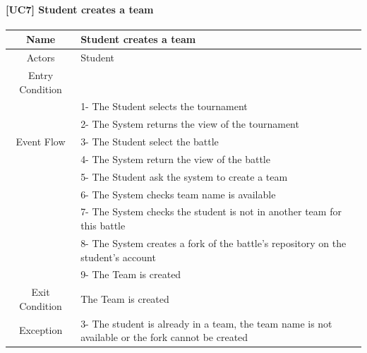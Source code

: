 \documentclass{article}
\begin{document}
\paragraph{[UC7] Student creates a team}
\begin{center}
\begin{tabular}{|c|m{40em}|}
\hline
Name & Student creates a team\\
\hline
\multirow{1}{4em}{Actors}
& Student\\
\hline
Entry Condition & 	\\
\hline
\multirow{5}{4em}{Event Flow}
& 1- The Student selects the tournament\\
& 2- The System returns the view of the tournament\\
& 3- The Student select the battle\\
& 4- The System return the view of the battle\\
& 5- The Student ask the system to create a team\\
& 6- The System checks team name is available\\
& 7- The System checks the student is not in another team for this battle\\
& 8- The System creates a fork of the battle's repository on the student's account\\
& 9- The Team is created\\
\hline
Exit Condition & The Team is created\\
\hline
Exception & 3- The student is already in a team, the team name is not available or the fork cannot be created\\
\hline
\end{tabular}
\end{center}
\end{document}
